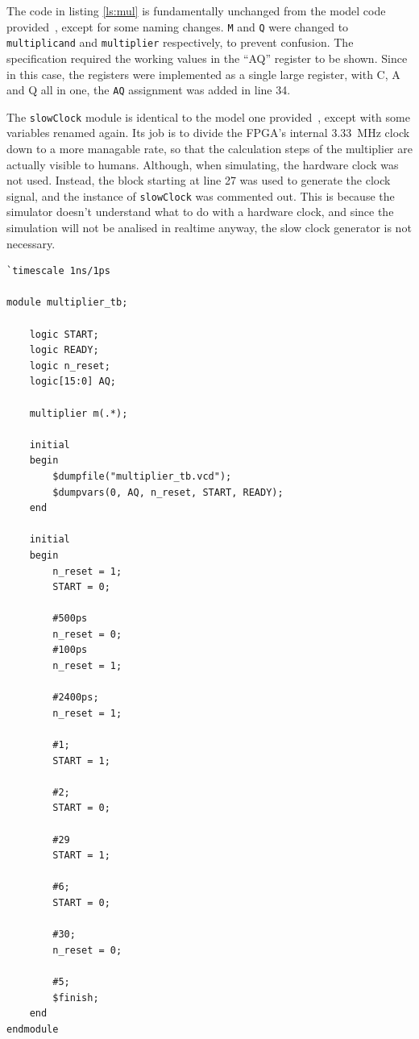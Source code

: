 \documentclass[a4paper,11pt]{article}
\begin{document}
The code in listing \ref{ls:mul} is fundamentally unchanged from the model code provided~\cite{multipliercode}, except for some naming changes. \lstinline{M} and \lstinline{Q} were changed to \lstinline{multiplicand} and \lstinline{multiplier} respectively, to prevent confusion. The specification required the working values in the ``AQ'' register to be shown. Since in this case, the registers were implemented as a single large register, with C, A and Q all in one, the \lstinline{AQ} assignment was added in line 34.

The \lstinline{slowClock} module is identical to the model one provided~\cite{slockcode}, except with some variables renamed again. Its job is to divide the FPGA's internal \SI{3.33}{\mega\hertz} clock down to a more managable rate, so that the calculation steps of the multiplier are actually visible to humans. Although, when simulating, the hardware clock was not used. Instead, the block starting at line 27 was used to generate the clock signal, and the instance of \lstinline{slowClock} was commented out. This is because the simulator doesn't understand what to do with a hardware clock, and since the simulation will not be analised in realtime anyway, the slow clock generator is not necessary.

\begin{lstlisting}
`timescale 1ns/1ps

module multiplier_tb;
    
    logic START;
    logic READY;
    logic n_reset;
    logic[15:0] AQ;
    
    multiplier m(.*);
    
    initial
    begin
        $dumpfile("multiplier_tb.vcd");
        $dumpvars(0, AQ, n_reset, START, READY);
    end
    
    initial
    begin
        n_reset = 1;
        START = 0;
        
        #500ps
        n_reset = 0;
        #100ps
        n_reset = 1;
        
        #2400ps;
        n_reset = 1;
        
        #1;
        START = 1;

        #2;
        START = 0;
        
        #29
        START = 1;

        #6;
        START = 0;
        
        #30;
        n_reset = 0;
        
        #5;
        $finish;
    end
endmodule
\end{lstlisting}
\end{document}
